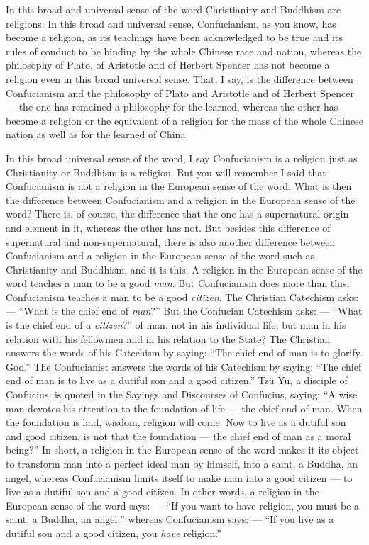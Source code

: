 In this broad and universal sense of the word Christianity and Buddhism are religions.
In this broad and universal sense, Confucianism, as you know, has become a religion, as its teachings have been acknowledged to be true and its rules of conduct to be binding by the whole Chinese race and nation, whereas the philosophy of Plato, of Aristotle and of Herbert Spencer has not become a religion even in this broad universal sense.
That, I say, is the difference between Confucianism and the philosophy of Plato and Aristotle and of Herbert Spencer --- the one has remained a philosophy for the learned, whereas the other has become a religion or the equivalent of a religion for the mass of the whole Chinese nation as well as for the learned of China.

In this broad universal sense of the word, I say Confucianism is a religion just as Christianity or Buddhism is a religion.
But you will remember I said that Confucianism is not a religion in the European sense of the word.
What is then the difference between Confucianism and a religion in the European sense of the word?
There is, of course, the difference that the one has a supernatural origin and element in it, whereas the other has not.
But besides this difference of supernatural and non-supernatural, there is also another difference between Confucianism and a religion in the European sense of the word such as Christianity and Buddhism, and it is this.
A religion in the European sense of the word teaches a man to be a good \emph{man}.
But Confucianism does more than this; Confucianism teaches a man to be a good \emph{citizen}.
The Christian Catechism asks: --- ``What is the chief end of \emph{man}?''
But the Confucian Catechism asks: --- ``What is the chief end of a \emph{citizen}?'' of man, not in his individual life, but man in his relation with his fellowmen and in his relation to the State?
The Christian answers the words of his Catechism by saying: ``The chief end of man is to glorify God.''
The Confucianist answers the words of his Catechism by saying: ``The chief end of man is to live as a dutiful son and a good citizen.''
Tz\"u Yu,  a disciple of Confucius, is quoted in the Sayings and Discourses of Confucius, saying: ``A wise man devotes his attention to the foundation of life --- the chief end of man. When the foundation is laid, wisdom, religion will come. Now to live as a dutiful son and good citizen, is not that the foundation --- the chief end of man as a moral being?''
In short, a religion in the European sense of the word makes it its object to transform man into a perfect ideal man by himself, into a saint, a Buddha, an angel, whereas Confucianism limits itself to make man into a good citizen --- to live as a dutiful son and a good citizen.
In other words, a religion in the European sense of the word says: --- ``If you want to have religion, you must be a saint, a Buddha, an angel;'' whereas Confucianism says: --- ``If you live as a dutiful son and a good citizen, you \emph{have} religion.''

